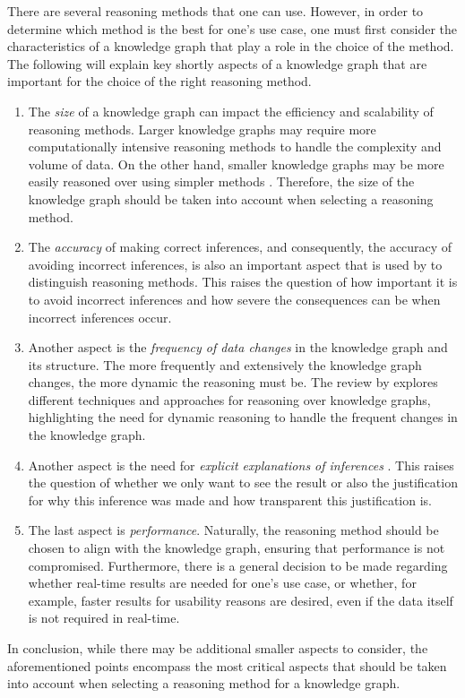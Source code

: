 \documentclass[
  a4paper,  %
  twoside,  %
  bibliography=totoc,
  headsepline,
  cleardoublepage=empty,
  parskip=half,
  draft=false
]{scrbook}
\begin{document}
There are several reasoning methods that one can use. However, in order to determine which method is the best for one's use case, one must first consider the characteristics of a knowledge graph that play a role in the choice of the method. The following will explain key shortly aspects of a knowledge graph that are important for the choice of the right reasoning method.

\begin{enumerate}
    \item The \textit{size} of a knowledge graph can impact the efficiency and scalability of reasoning methods. Larger knowledge graphs may require more computationally intensive reasoning methods to handle the complexity and volume of data. On the other hand, smaller knowledge graphs may be more easily reasoned over using simpler methods \cite{Chen.2020}. Therefore, the size of the knowledge graph should be taken into account when selecting a reasoning method.
    \item The \textit{accuracy} of making correct inferences, and consequently, the accuracy of avoiding incorrect inferences, is also an important aspect that is used by \cite{TIAN2022100159} to distinguish reasoning methods. This raises the question of how important it is to avoid incorrect inferences and how severe the consequences can be when incorrect inferences occur.
    \item Another aspect is the \textit{frequency of data changes} in the knowledge graph and its structure. The more frequently and extensively the knowledge graph changes, the more dynamic the reasoning must be. The review by \cite{Chen.2020} explores different techniques and approaches for reasoning over knowledge graphs, highlighting the need for dynamic reasoning to handle the frequent changes in the knowledge graph.
    \item Another aspect is the need for \textit{explicit explanations of inferences} \cite{TIAN2022100159}. This raises the question of whether we only want to see the result or also the justification for why this inference was made and how transparent this justification is.
    \item The last aspect is \textit{performance}. Naturally, the reasoning method should be chosen to align with the knowledge graph, ensuring that performance is not compromised. Furthermore, there is a general decision to be made regarding whether real-time results are needed for one's use case, or whether, for example, faster results for usability reasons are desired, even if the data itself is not required in real-time.

\end{enumerate}
In conclusion, while there may be additional smaller aspects to consider, the aforementioned points encompass the most critical aspects that should be taken into account when selecting a reasoning method for a knowledge graph.
\end{document}
